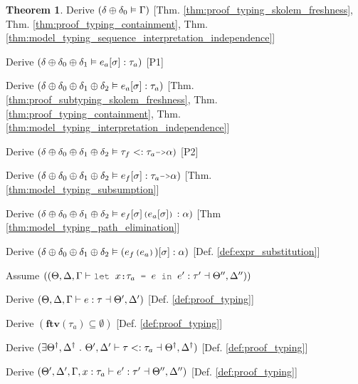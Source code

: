 \documentclass[acmsmall]{acmart}
\theoremstyle{definition}
\newtheorem{theorem}{Theorem}[section]
\begin{document}
\begin{theorem}
  \item \I\I \N Derive $(
    \delta \oplus \delta_0 \vDash \Gamma
  )$ [Thm. \ref{thm:proof_typing_skolem_freshness},
      Thm. \ref{thm:proof_typing_containment},
      Thm. \ref{thm:model_typing_sequence_interpretation_independence}]

  \item \I\I \N Derive $(
    \delta \oplus \delta_0 \oplus \delta_1 \vDash e_a[\sigma] : \tau_a
  )$ [P1]

  \item \I\I \N Derive $(
    \delta \oplus \delta_0 \oplus \delta_1 \oplus \delta_2 \vDash e_a[\sigma] : \tau_a
  )$ [Thm. \ref{thm:proof_subtyping_skolem_freshness}, 
      Thm. \ref{thm:proof_typing_containment},
      Thm. \ref{thm:model_typing_interpretation_independence}]

  \item \I\I \N Derive $(
    \delta \oplus \delta_0 \oplus \delta_1 \oplus \delta_2  \satisfies \tau_f \subtypes \tau_a \J{->} \alpha
  )$ [P2]

  \item \I\I \N Derive $(
    \delta \oplus \delta_0 \oplus \delta_1 \oplus \delta_2 \satisfies e_f[\sigma] \hastype \tau_a \J{->} \alpha
  )$ [Thm. \ref{thm:model_typing_subsumption}]

  \item \I\I \N Derive $(
    \delta \oplus \delta_0 \oplus \delta_1 \oplus \delta_2 \satisfies e_f[\sigma]\J{(}e_a[\sigma]\J{)} \hastype \alpha
  )$ [Thm \ref{thm:model_typing_path_elimination}]

  \item \I\I \N Derive $(
    \delta \oplus \delta_0 \oplus \delta_1 \oplus \delta_2 \satisfies (e_f\J{(}e_a\J{)})[\sigma] \hastype \alpha
  )$ [Def. \ref{def:expr_substitution}]


  \item \N Assume $(
    (\Theta, \Delta, \Gamma \entails \J{let } x \J{:} \tau_a \J{ = } e \J{ in } e' \hastype \tau' \given \Theta'', \Delta'')
  )$
  \item \I \N Derive $(
    \Theta, \Delta, \Gamma \vdash e : \tau \dashv \Theta', \Delta' 
  )$ [Def. \ref{def:proof_typing}]
  \item \I \N Derive $(
    \textbf{ftv}(\tau_a) \subseteq \emptyset
  )$ [Def. \ref{def:proof_typing}]
  \item \I \N Derive $(
    \exists \Theta^\dagger, \Delta^\dagger \ .\  \Theta', \Delta' \vdash \tau <: \tau_a \dashv \Theta^\dagger, \Delta^\dagger
  )$ [Def. \ref{def:proof_typing}]
  \item \I \N Derive $(
    \Theta', \Delta', \Gamma, x:\tau_a \vdash e' : \tau' \dashv \Theta'', \Delta''
  )$ [Def. \ref{def:proof_typing}]



\end{theorem}
\end{document}
